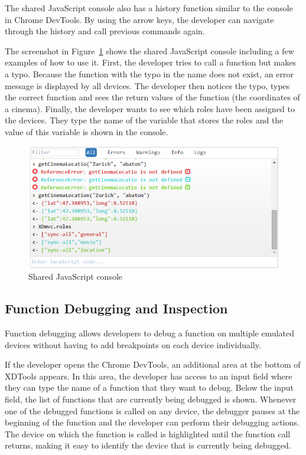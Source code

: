 The shared JavaScript console also has a history function similar to the console in Chrome DevTools. By using the arrow keys, the developer can navigate through the history and call previous commands again.

The screenshot in Figure~\ref{fig:js_console} shows the shared JavaScript console including a few examples of how to use it. First, the developer tries to call a function but makes a typo. Because the function with the typo in the name does not exist, an error message is displayed by all devices. The developer then notices the typo, types the correct function and sees the return values of the function (the coordinates of a cinema). Finally, the developer wants to see which roles have been assigned to the devices. They type the name of the variable that stores the roles and the value of this variable is shown in the console.

\begin{figure}[H]
  \centering
    \includegraphics[width=1.0\textwidth]{images/screenshots/js_console_3.png}
	\caption[Screenshot: JavaScript console]{Shared JavaScript console}
	\label{fig:js_console}
\end{figure}

\subsection{Function Debugging and Inspection}

Function debugging allows developers to debug a function on multiple emulated devices without having to add breakpoints on each device individually.

If the developer opens the Chrome DevTools, an additional area at the bottom of XDTools appears. In this area, the developer has access to an input field where they can type the name of a function that they want to debug. Below the input field, the list of functions that are currently being debugged is shown. Whenever one of the debugged functions is called on any device, the debugger pauses at the beginning of the function and the developer can perform their debugging actions. The device on which the function is called is highlighted until the function call returns, making it easy to identify the device that is currently being debugged.

